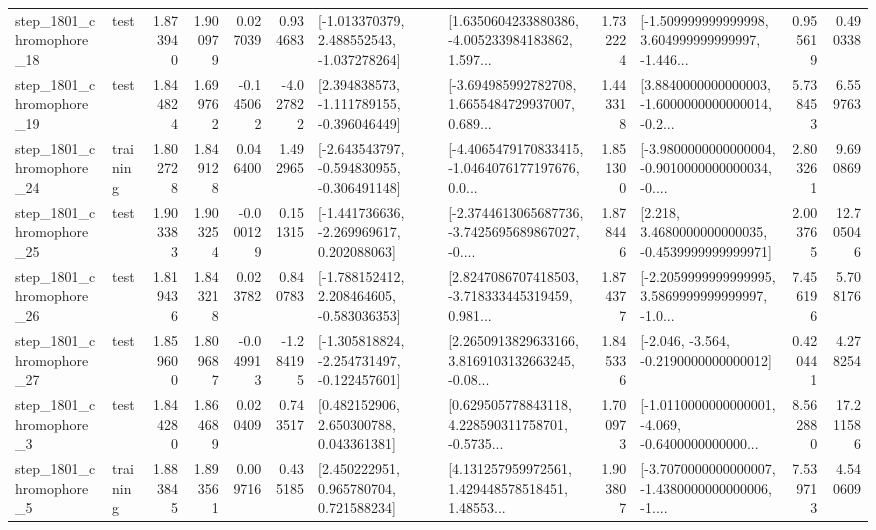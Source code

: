 \begin{tabular}{llrrrrllrlrr}
 step\_1801\_chromophore\_18 &      test &      1.873940 &    1.900979 &      0.027039 &  0.934683 &   [-1.013370379, 2.488552543, -1.037278264] &  [1.6350604233880386, -4.005233984183862, 1.597... &       1.732224 &  [-1.509999999999998, 3.604999999999997, -1.446... &            0.955619 &          0.490338 \\
 step\_1801\_chromophore\_19 &      test &      1.844824 &    1.699762 &     -0.145062 & -4.027822 &   [2.394838573, -1.111789155, -0.396046449] &  [-3.694985992782708, 1.6655484729937007, 0.689... &       1.443318 &  [3.8840000000000003, -1.6000000000000014, -0.2... &            5.738453 &          6.559763 \\
 step\_1801\_chromophore\_24 &  training &      1.802728 &    1.849128 &      0.046400 &  1.492965 &  [-2.643543797, -0.594830955, -0.306491148] &  [-4.4065479170833415, -1.0464076177197676, 0.0... &       1.851300 &  [-3.9800000000000004, -0.9010000000000034, -0.... &            2.803261 &          9.690869 \\
 step\_1801\_chromophore\_25 &      test &      1.903383 &    1.903254 &     -0.000129 &  0.151315 &   [-1.441736636, -2.269969617, 0.202088063] &  [-2.3744613065687736, -3.7425695689867027, -0.... &       1.878446 &   [2.218, 3.4680000000000035, -0.4539999999999971] &            2.003765 &         12.705046 \\
 step\_1801\_chromophore\_26 &      test &      1.819436 &    1.843218 &      0.023782 &  0.840783 &   [-1.788152412, 2.208464605, -0.583036353] &  [2.8247086707418503, -3.718333445319459, 0.981... &       1.874377 &  [-2.2059999999999995, 3.5869999999999997, -1.0... &            7.456196 &          5.708176 \\
 step\_1801\_chromophore\_27 &      test &      1.859600 &    1.809687 &     -0.049913 & -1.284195 &  [-1.305818824, -2.254731497, -0.122457601] &  [2.2650913829633166, 3.8169103132663245, -0.08... &       1.845336 &              [-2.046, -3.564, -0.2190000000000012] &            0.420441 &          4.278254 \\
  step\_1801\_chromophore\_3 &      test &      1.844280 &    1.864689 &      0.020409 &  0.743517 &     [0.482152906, 2.650300788, 0.043361381] &  [0.629505778843118, 4.228590311758701, -0.5735... &       1.700973 &  [-1.0110000000000001, -4.069, -0.6400000000000... &            8.562880 &         17.211586 \\
  step\_1801\_chromophore\_5 &  training &      1.883845 &    1.893561 &      0.009716 &  0.435185 &     [2.450222951, 0.965780704, 0.721588234] &  [4.131257959972561, 1.429448578518451, 1.48553... &       1.903807 &  [-3.7070000000000007, -1.4380000000000006, -1.... &            7.539713 &          4.540609 \\

\end{tabular}
